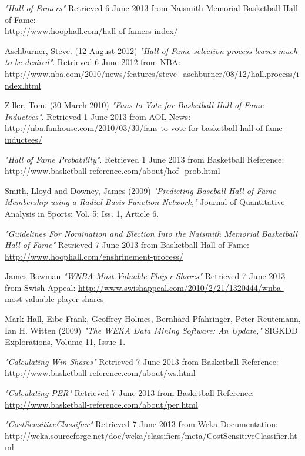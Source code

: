 \documentclass[paper=a4, fontsize=11pt]{scrartcl} %
\numberwithin{equation}{section} %
\numberwithin{figure}{section} %
\numberwithin{table}{section} %
\begin{document}
\begin{thebibliography}{9}

	\emph{"Hall of Famers"}
	Retrieved 6 June 2013 from Naismith Memorial Basketball Hall of Fame:\\
	\url{http://www.hoophall.com/hall-of-famers-index/} 

Aschburner, Steve. (12 August 2012)
\emph{"Hall of Fame selection process leaves much to be desired"}.
Retrieved 6 June 2012 from NBA:
\url{http://www.nba.com/2010/news/features/steve_aschburner/08/12/hall.process/index.html}   

   Ziller, Tom. (30 March 2010)
  \emph{"Fans to Vote for Basketball Hall of Fame Inductees"}.
   Retrieved 1 June 2013 from AOL News:
   \url{http://nba.fanhouse.com/2010/03/30/fans-to-vote-for-basketball-hall-of-fame-inductees/}
   
  \emph{"Hall of Fame Probability"}.
   Retrieved 1 June 2013 from Basketball Reference:\\
   \url{http://www.basketball-reference.com/about/hof_prob.html}  
 
Smith, Lloyd and Downey, James (2009)
\emph{"Predicting Baseball Hall of Fame Membership using a Radial Basis Function Network,"}
Journal of Quantitative Analysis in Sports: Vol. 5: Iss. 1, Article 6.
 
 \emph{"Guidelines For Nomination and Election Into the Naismith Memorial Basketball Hall of Fame"}
 Retrieved 7 June 2013 from Basketball Hall of Fame:
 \url{http://www.hoophall.com/enshrinement-process/}
 
 James Bowman
 \emph{"WNBA Most Valuable Player Shares"}
 Retrieved 7 June 2013 from Swish Appeal:
 \url{http://www.swishappeal.com/2010/2/21/1320444/wnba-most-valuable-player-shares}
 
 Mark Hall, Eibe Frank, Geoffrey Holmes, Bernhard Pfahringer, Peter Reutemann, Ian H. Witten (2009)
 \emph{"The WEKA Data Mining Software: An Update,"} 
 SIGKDD Explorations, Volume 11, Issue 1.
 
 \emph{"Calculating Win Shares"}
  Retrieved 7 June 2013 from Basketball Reference:
 \url{http://www.basketball-reference.com/about/ws.html}

 \emph{"Calculating PER"}
  Retrieved 7 June 2013 from Basketball Reference:
 \url{ http://www.basketball-reference.com/about/per.html}

\emph{"CostSensitiveClassifier"}
  Retrieved 7 June 2013 from Weka Documentation:
\url{http://weka.sourceforge.net/doc/weka/classifiers/meta/CostSensitiveClassifier.html}
 
\end{thebibliography}
\end{document}
